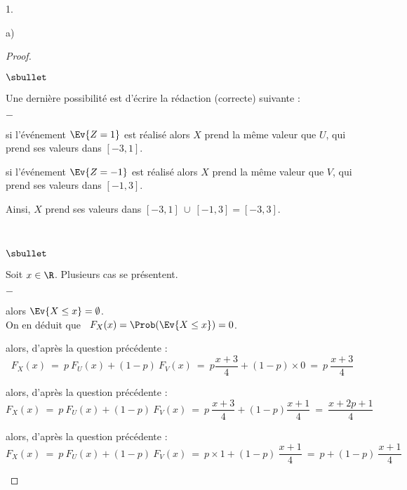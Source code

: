 \documentclass[11pt]{article}%
\begin{document}
\begin{noliste}{1.}
\begin{noliste}{a)}
\begin{proof}
\begin{remark}
\begin{noliste}{$\sbullet$}
        \item Une dernière possibilité est d'écrire la rédaction
          (correcte) suivante :
          \begin{noliste}{$-$}
          \item si l'événement $\Ev{Z = 1}$ est réalisé alors $X$
            prend la même valeur que $U$, \var qui prend ses valeurs
            dans $[-3,1]$.
          \item si l'événement $\Ev{Z = -1}$ est réalisé alors $X$
            prend la même valeur que $V$, \var qui prend ses valeurs
            dans $[-1,3]$.
          \end{noliste}
          Ainsi, $X$ prend ses valeurs dans $[-3, 1] \ \cup \ [-1,3]
          = [-3, 3]$.
        \end{noliste}
      \end{remark}~\\[-1.4cm]
      \begin{noliste}{$\sbullet$}
      \item Soit $x\in\R$. Plusieurs cas se présentent.
        \begin{noliste}{$-$}
        \item {} alors $\Ev{X \leq x} =
          \emptyset$.\\[.1cm]
          On en déduit que \ $F_X(x) = \Prob(\Ev{X\leq x}) = 0$.
    
        \item {} alors, d'après la question
          précédente : 
          \[
          F_X(x) \ = \ p \ F_U(x) + (1-p) \ F_V(x) \ = \ p
          \dfrac{x+3}{4} + (1-p) \times 0 \ = \ p \ \dfrac{x+3}{4}
          \]
          
        \item {} alors, d'après la question
          précédente : 
          \[
          F_X(x) \ = \ p \ F_U(x) + (1-p) \ F_V(x) \ = \ p \
          \dfrac{x+3}{4}+(1-p)\frac{x+1}{4} \ = \ \dfrac{x+2p+1}{4}
          \]
          
        \item {} alors, d'après la question
          précédente :
          \[
          F_X(x) \ = \ p \ F_U(x) + (1-p) \ F_V(x) \ = \ p \times 1 +
          (1-p) \ \dfrac{x+1}{4} \ = \ p + (1-p) \ \dfrac{x+1}{4}
          \]
          

\end{noliste}
\end{noliste}
\end{proof}
\end{noliste}
\end{noliste}
\end{document}

